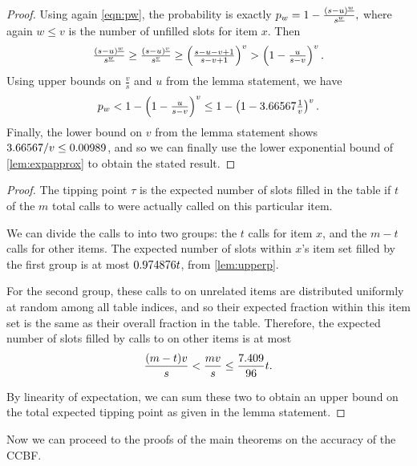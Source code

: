 \begin{proof}
    Using again \eqref{eqn:pw}, the probability is exactly
    $p_w = 1 - \frac{{(s-u)}^{\underline{w}}}{{s}^{\underline{w}}},$
    where again $w\le v$ is the number of unfilled slots for
    item $x$. Then
    \[
        \tfrac{{(s-u)}^{\underline{w}}}{{s}^{\underline{w}}}
        \ge \tfrac{{(s-u)}^{\underline{v}}}{{s}^{\underline{v}}}
        \ge \left(\tfrac{s-u-v+1}{s-v+1}\right)^v
        > \left(1 - \tfrac{u}{s-v}\right)^v.
    \]
    Using upper bounds on $\frac{v}{s}$ and $u$ from the lemma statement, we have
    \[p_w
        < 1 - \left(1 - \tfrac{u}{s-v}\right)^v
        \le 1 - \left(1 - 3.66567{}\tfrac{1}{v}\right)^v.\]
    Finally, the lower bound on $v$ from the lemma statement shows $3.66567{}/v \le 0.00989{}$, and so we can finally use the lower exponential bound of \cref{lem:expapprox} to obtain the stated result.
\end{proof}

\lemmauppertau*

\begin{proof}
    The tipping point $\tau$ is the expected number of slots filled in the table
    if $t$ of the $m$ total calls to \Increment{} were actually called on this
    particular item.
    
    We can divide the calls to \Increment{} into two groups: the $t$ calls for
    item $x$, and the $m-t$ calls for other items. The expected number of slots
    within $x$'s item set filled by the first group is at most
    $0.974876 t$, from \cref{lem:upperp}.
    
    For the second group, these calls to
    \Increment{} on unrelated items are distributed uniformly at random among
    all table indices, and so their expected fraction within this item set
    is the same as their overall fraction in the table. Therefore, the expected
    number of slots filled by calls to \Increment{} on other items is at most
    \[\frac{(m-t)v}{s} < \frac{mv}{s} 
        \le \frac{7.409}{96} t.\]
    
    By linearity of expectation, we can sum these two to obtain an upper bound
    on the total expected tipping point as given in the lemma statement.
\end{proof}

Now we can proceed to the proofs of the main theorems on the accuracy of the CCBF.

\theoremfp*

